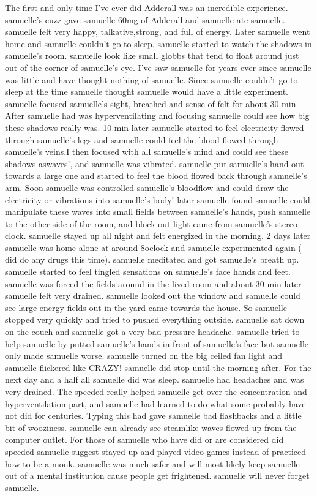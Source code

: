 \documentclass[12pt]{book}
\begin{document}
The first and only time I've ever did Adderall was an incredible experience. samuelle's cuzz gave samuelle 60mg of Adderall and samuelle ate samuelle. samuelle felt very happy, talkative,strong, and full of energy. Later samuelle went home and samuelle couldn't go to sleep. samuelle started to watch the shadows in samuelle's room. samuelle look like small globbs that tend to float around just out of the corner of samuelle's eye. I've saw samuelle for years ever since samuelle was little and have thought nothing of samuelle. Since samuelle couldn't go to sleep at the time samuelle thought samuelle would have a little experiment. samuelle focused samuelle's sight, breathed and sense of felt for about 30 min. After samuelle had was hyperventilating and focusing samuelle could see how big these shadows really was. 10 min later samuelle started to feel electricity flowed through samuelle's legs and samuelle could feel the blood flowed through samuelle's veins.I then focused with all samuelle's mind and could see these shadows aswaves', and samuelle was vibrated. samuelle put samuelle's hand out towards a large one and started to feel the blood flowed back through samuelle's arm. Soon samuelle was controlled samuelle's bloodflow and could draw the electricity or vibrations into samuelle's body! later samuelle found samuelle could manipulate these waves into small fields between samuelle's hands, push samuelle to the other side of the room, and block out light came from samuelle's stereo clock. samuelle stayed up all night and felt energized in the morning. 2 days later samuelle was home alone at around 8oclock and samuelle experimented again ( did do any drugs this time). samuelle meditated and got samuelle's breath up. samuelle started to feel tingled sensations on samuelle's face hands and feet. samuelle was forced the fields around in the lived room and about 30 min later samuelle felt very drained. samuelle looked out the window and samuelle could see large energy fields out in the yard came towards the house. So samuelle stopped very quickly and tried to pushed everything outside. samuelle sat down on the couch and samuelle got a very bad pressure headache. samuelle tried to help samuelle by putted samuelle's hands in front of samuelle's face but samuelle only made samuelle worse. samuelle turned on the big ceiled fan light and samuelle flickered like CRAZY! samuelle did stop until the morning after. For the next day and a half all samuelle did was sleep. samuelle had headaches and was very drained. The speeded really helped samuelle get over the concentration and hyperventilation part, and samuelle had learned to do what some probably have not did for centuries. Typing this had gave samuelle bad flashbacks and a little bit of wooziness. samuelle can already see steamlike waves flowed up from the computer outlet. For those of samuelle who have did or are considered did speeded samuelle suggest stayed up and played video games instead of practiced how to be a monk. samuelle was much safer and will most likely keep samuelle out of a mental institution cause people get frightened. samuelle will never forget samuelle.
\end{document}
